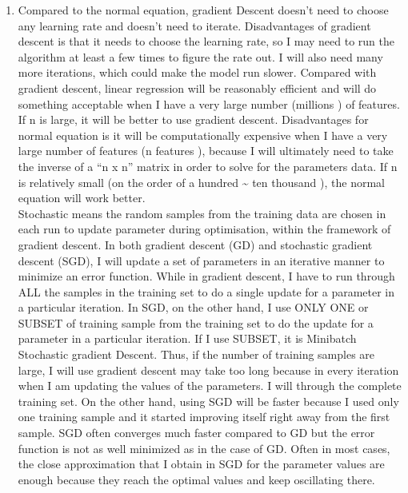 \documentclass[11pt]{article}
\providecommand{\tightlist}{%
      \setlength{\itemsep}{0pt}\setlength{\parskip}{0pt}}
\begin{document}
    \begin{enumerate}
\def\labelenumi{\arabic{enumi}.}
\tightlist
\item
  Compared to the normal equation, gradient Descent doesn't need to
  choose any learning rate and doesn't need to iterate. Disadvantages of
  gradient descent is that it needs to choose the learning rate, so I
  may need to run the algorithm at least a few times to figure the rate
  out. I will also need many more iterations, which could make the model
  run slower. Compared with gradient descent, linear regression will be
  reasonably efficient and will do something acceptable when I have a
  very large number (millions ) of features. If n is large, it will be
  better to use gradient descent. Disadvantages for normal equation is
  it will be computationally expensive when I have a very large number
  of features (n features ), because I will ultimately need to take the
  inverse of a ``n x n'' matrix in order to solve for the parameters
  data. If n is relatively small (on the order of a hundred
  \textasciitilde{} ten thousand ), the normal equation will work
  better.\\
  Stochastic means the random samples from the training data are chosen
  in each run to update parameter during optimisation, within the
  framework of gradient descent. In both gradient descent (GD) and
  stochastic gradient descent (SGD), I will update a set of parameters
  in an iterative manner to minimize an error function. While in
  gradient descent, I have to run through ALL the samples in the
  training set to do a single update for a parameter in a particular
  iteration. In SGD, on the other hand, I use ONLY ONE or SUBSET of
  training sample from the training set to do the update for a parameter
  in a particular iteration. If I use SUBSET, it is Minibatch Stochastic
  gradient Descent. Thus, if the number of training samples are large, I
  will use gradient descent may take too long because in every iteration
  when I am updating the values of the parameters. I will through the
  complete training set. On the other hand, using SGD will be faster
  because I used only one training sample and it started improving
  itself right away from the first sample. SGD often converges much
  faster compared to GD but the error function is not as well minimized
  as in the case of GD. Often in most cases, the close approximation
  that I obtain in SGD for the parameter values are enough because they
  reach the optimal values and keep oscillating there.
\end{enumerate}
\end{document}
